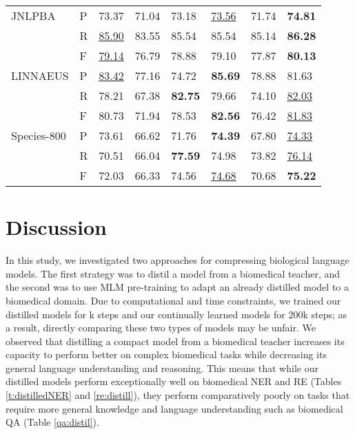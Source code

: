 \documentclass{article}
\begin{document}
\begin{table}[ht!]
{\begin{tabular}{L{2.5cm}P{1.5cm}P{2cm}P{2cm}P{2cm}P{2cm}P{2cm}P{2.5cm}}
        JNLPBA & P & 73.37 & 71.04 & 73.18 & \underline{73.56} & 71.74 & \textbf{74.81}\\
               & R & \underline{85.90} & 83.55 & 85.54 & 85.54 & 85.14 & \textbf{86.28}\\
               & F & \underline{79.14} & 76.79 & 78.88 & 79.10 & 77.87 & \textbf{80.13}\\
        
        LINNAEUS & P & \underline{83.42} & 77.16 & 74.72 & \textbf{85.69} & 78.88 & 81.63\\
                 & R & 78.21 & 67.38 & \textbf{82.75} & 79.66 & 74.10 & \underline{82.03}\\
                 & F & 80.73 & 71.94 & 78.53 & \textbf{82.56} & 76.42 & \underline{81.83}\\
                     
        Species-800 & P & 73.61 & 66.62 & 71.76 & \textbf{74.39} & 67.80 & \underline{74.33}\\
                    & R & 70.51 & 66.04 & \textbf{77.59} & 74.98 & 73.82 & \underline{76.14}\\
                    & F & 72.03 & 66.33 & 74.56 & \underline{74.68} & 70.68 & \textbf{75.22}\\
                   \bottomrule
    \end{tabular}}
    \vspace{10pt}
    
\end{table}









\section{Discussion}
In this study, we investigated two approaches for compressing biological language models.
The first strategy was to distil a model from a biomedical teacher, and the second was to use MLM pre-training to adapt an already distilled model to a biomedical domain. Due to computational and time constraints, we trained our distilled models for k steps and our continually learned models for 200k steps; as a result, directly comparing these two types of models may be unfair. We observed that distilling a compact model from a biomedical teacher increases its capacity to perform better on complex biomedical tasks while decreasing its general language understanding and reasoning. This means that while our distilled models perform exceptionally well on biomedical NER and RE (Tables \ref{t:distilledNER} and \ref{re:distill}), they perform comparatively poorly on tasks that require more general knowledge and language understanding such as biomedical QA (Table \ref{qa:distil}). 
\end{document}
